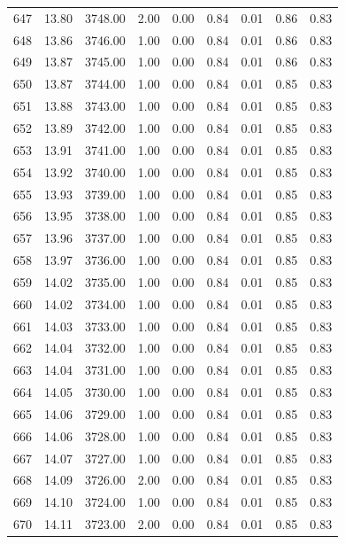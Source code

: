 \documentclass{article}\usepackage[]{graphicx}\usepackage[]{color}
\begin{document}
\begin{longtable}{rrrrrrrrr}
  647 & 13.80 & 3748.00 & 2.00 & 0.00 & 0.84 & 0.01 & 0.86 & 0.83 \\ 
  648 & 13.86 & 3746.00 & 1.00 & 0.00 & 0.84 & 0.01 & 0.86 & 0.83 \\ 
  649 & 13.87 & 3745.00 & 1.00 & 0.00 & 0.84 & 0.01 & 0.86 & 0.83 \\ 
  650 & 13.87 & 3744.00 & 1.00 & 0.00 & 0.84 & 0.01 & 0.85 & 0.83 \\ 
  651 & 13.88 & 3743.00 & 1.00 & 0.00 & 0.84 & 0.01 & 0.85 & 0.83 \\ 
  652 & 13.89 & 3742.00 & 1.00 & 0.00 & 0.84 & 0.01 & 0.85 & 0.83 \\ 
  653 & 13.91 & 3741.00 & 1.00 & 0.00 & 0.84 & 0.01 & 0.85 & 0.83 \\ 
  654 & 13.92 & 3740.00 & 1.00 & 0.00 & 0.84 & 0.01 & 0.85 & 0.83 \\ 
  655 & 13.93 & 3739.00 & 1.00 & 0.00 & 0.84 & 0.01 & 0.85 & 0.83 \\ 
  656 & 13.95 & 3738.00 & 1.00 & 0.00 & 0.84 & 0.01 & 0.85 & 0.83 \\ 
  657 & 13.96 & 3737.00 & 1.00 & 0.00 & 0.84 & 0.01 & 0.85 & 0.83 \\ 
  658 & 13.97 & 3736.00 & 1.00 & 0.00 & 0.84 & 0.01 & 0.85 & 0.83 \\ 
  659 & 14.02 & 3735.00 & 1.00 & 0.00 & 0.84 & 0.01 & 0.85 & 0.83 \\ 
  660 & 14.02 & 3734.00 & 1.00 & 0.00 & 0.84 & 0.01 & 0.85 & 0.83 \\ 
  661 & 14.03 & 3733.00 & 1.00 & 0.00 & 0.84 & 0.01 & 0.85 & 0.83 \\ 
  662 & 14.04 & 3732.00 & 1.00 & 0.00 & 0.84 & 0.01 & 0.85 & 0.83 \\ 
  663 & 14.04 & 3731.00 & 1.00 & 0.00 & 0.84 & 0.01 & 0.85 & 0.83 \\ 
  664 & 14.05 & 3730.00 & 1.00 & 0.00 & 0.84 & 0.01 & 0.85 & 0.83 \\ 
  665 & 14.06 & 3729.00 & 1.00 & 0.00 & 0.84 & 0.01 & 0.85 & 0.83 \\ 
  666 & 14.06 & 3728.00 & 1.00 & 0.00 & 0.84 & 0.01 & 0.85 & 0.83 \\ 
  667 & 14.07 & 3727.00 & 1.00 & 0.00 & 0.84 & 0.01 & 0.85 & 0.83 \\ 
  668 & 14.09 & 3726.00 & 2.00 & 0.00 & 0.84 & 0.01 & 0.85 & 0.83 \\ 
  669 & 14.10 & 3724.00 & 1.00 & 0.00 & 0.84 & 0.01 & 0.85 & 0.83 \\ 
  670 & 14.11 & 3723.00 & 2.00 & 0.00 & 0.84 & 0.01 & 0.85 & 0.83 \\ 

\end{longtable}
\end{document}
